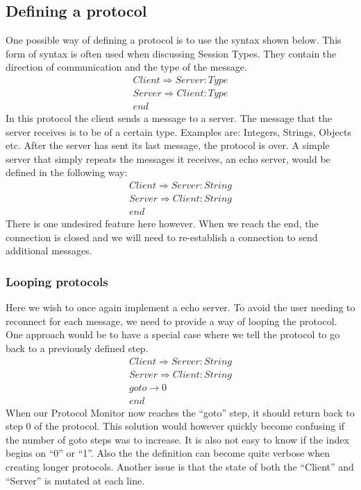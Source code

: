 

\subsection{Defining a protocol}
One possible way of defining a protocol is to use the syntax shown below. This form of syntax is often used when discussing Session Types. They contain the direction of communication and the type of the message. 
$$
\begin{multlined}
Client \Rightarrow Server : Type \\ 
Server \Rightarrow Client : Type \\
end
\end{multlined}
$$
In this protocol the client sends a message to a server. The message that the server receives is to be of a certain type. Examples are: Integers, Strings, Objects etc. After the server has sent its last message, the protocol is over. 
A simple server that simply repeats the messages it receives, an echo server, would be defined in the following way:
$$
\begin{multlined}
Client \Rightarrow Server : String \\ 
Server \Rightarrow Client : String \\
end
\end{multlined}
$$
There is one undesired feature here however. When we reach the end, the connection is closed and we will need to re-establish a connection to send additional messages.
\subsubsection{Looping protocols}
Here we wish to once again implement a echo server. To avoid the user needing to reconnect for each message, we need to provide a way of looping the protocol. One approach would be to have a special case where we tell the protocol to go back to a previously defined step.
$$
\begin{multlined}
Client \Rightarrow Server : String \\ 
Server \Rightarrow Client : String \\ 
goto \rightarrow 0 \\
end
\end{multlined}
$$
When our Protocol Monitor now reaches the ``goto'' step, it should return back to step 0 of the protocol. This solution would however quickly become confusing if the number of goto steps was to increase. It is also not easy to know if the index begins on ``0'' or ``1''.
Also the the definition can become quite verbose when creating longer protocols. Another issue is that the state of both the ``Client'' and ``Server'' is mutated at each line.

